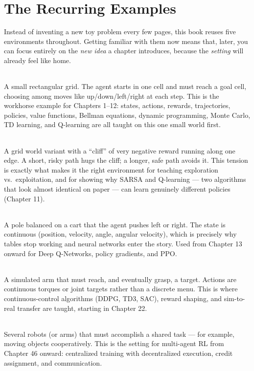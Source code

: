 \section{The Recurring Examples}
\label{sec:recurring-examples}

Instead of inventing a new toy problem every few pages, this book reuses
five environments throughout. Getting familiar with them now means that,
later, you can focus entirely on the \emph{new idea} a chapter introduces,
because the \emph{setting} will already feel like home.

\begin{description}[leftmargin=1.6cm, style=nextline]
  \item[Example A — Grid World] \hfill \\
  A small rectangular grid. The agent starts in one cell and must reach a
  goal cell, choosing among moves like up/down/left/right at each step.
  This is the workhorse example for Chapters 1–12: states, actions,
  rewards, trajectories, policies, value functions, Bellman equations,
  dynamic programming, Monte Carlo, TD learning, and Q-learning are all
  taught on this one small world first.

  \item[Example B — Cliff Walking] \hfill \\
  A grid world variant with a ``cliff'' of very negative reward running
  along one edge. A short, risky path hugs the cliff; a longer, safe path
  avoids it. This tension is exactly what makes it the right environment
  for teaching exploration vs.\ exploitation, and for showing why SARSA
  and Q-learning — two algorithms that look almost identical on paper —
  can learn genuinely different policies (Chapter 11).

  \item[Example C — CartPole] \hfill \\
  A pole balanced on a cart that the agent pushes left or right. The state
  is continuous (position, velocity, angle, angular velocity), which is
  precisely why tables stop working and neural networks enter the story.
  Used from Chapter 13 onward for Deep Q-Networks, policy gradients, and
  PPO.

  \item[Example D — Robotic Arm] \hfill \\
  A simulated arm that must reach, and eventually grasp, a target. Actions
  are continuous torques or joint targets rather than a discrete menu.
  This is where continuous-control algorithms (DDPG, TD3, SAC), reward
  shaping, and sim-to-real transfer are taught, starting in Chapter 22.

  \item[Example E — Multiple Robots] \hfill \\
  Several robots (or arms) that must accomplish a shared task — for
  example, moving objects cooperatively. This is the setting for
  multi-agent RL from Chapter 46 onward: centralized training with
  decentralized execution, credit assignment, and communication.
\end{description}

